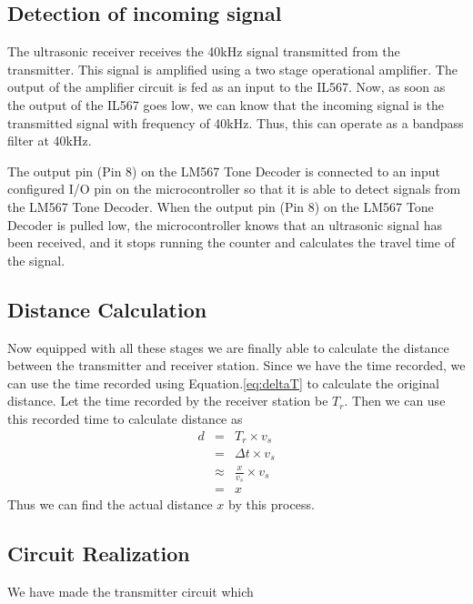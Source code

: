 \subsection{Detection of incoming signal}
The ultrasonic receiver receives the 40kHz signal transmitted from the transmitter. This signal is amplified using a two stage operational amplifier. The output of the amplifier circuit is fed as an input to the IL567. Now, as soon as the output of the IL567 goes low, we can know that the incoming signal is the transmitted signal with frequency of 40kHz. Thus, this can operate as a bandpass filter at 40kHz.

The output pin (Pin 8) on the LM567 Tone Decoder is connected to an input configured I/O pin on the microcontroller so that it is able to detect signals from the LM567 Tone Decoder. When the output pin (Pin 8) on the LM567 Tone Decoder is pulled low, the microcontroller knows that an ultrasonic signal has been received, and it stops running the counter and calculates the travel time of the signal.

\subsection{Distance Calculation}
Now equipped with all these stages we are finally able to calculate the distance between the transmitter and receiver station. Since we have the time recorded, we can use the time recorded using Equation.\ref{eq:deltaT} to calculate the original distance. Let the time recorded by the receiver station be $T_r$. Then we can use this recorded time to calculate distance as
\begin{eqnarray*}
	d &=& T_r \times v_s\\
	{}&=&\Delta t \times v_s\\
	{}&\approx&\frac{x}{v_s} \times v_s\\
	{}& = & x
\end{eqnarray*}
Thus we can find the actual distance $x$ by this process.

\subsection{Circuit Realization}
We have made the transmitter circuit which 

